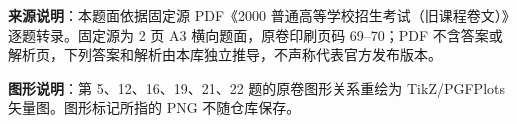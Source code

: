 


\begin{gktip}
\textbf{来源说明}：本题面依据固定源 PDF《2000 普通高等学校招生考试（旧课程卷文）》逐题转录。固定源为 2 页 A3 横向题面，原卷印刷页码 69–70；PDF 不含答案或解析页，下列答案和解析由本库独立推导，不声称代表官方发布版本。

\textbf{图形说明}：第 5、12、16、19、21、22 题的原卷图形关系重绘为 TikZ/PGFPlots 矢量图。图形标记所指的 PNG 不随仓库保存。
\end{gktip}


